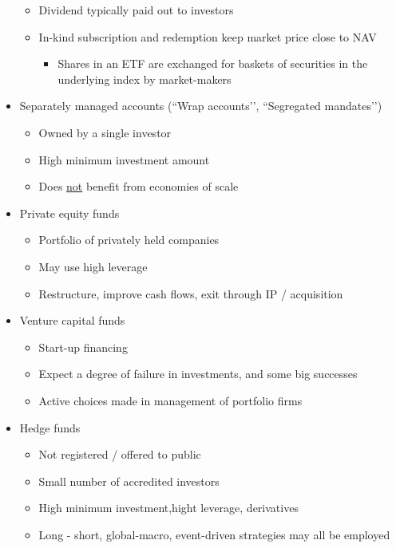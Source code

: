 \documentclass[../notes_compiled.tex]{subfiles}
\begin{document}
\begin{itemize}
\begin{itemize}
\item Dividend typically paid out to investors
\item In-kind subscription and redemption keep market price close to NAV
\begin{itemize}
\item Shares in an ETF are exchanged for baskets of securities in the underlying index by market-makers
\end{itemize}
\end{itemize}
\item Separately managed accounts (``Wrap accounts’’, ``Segregated mandates’’)
\begin{itemize}
\item Owned by a single investor
\item High minimum investment amount
\item Does \underline{not} benefit from economies of scale
\end{itemize}
\item Private equity funds
\begin{itemize}
\item Portfolio of privately held companies
\item May use high leverage
\item Restructure, improve cash flows, exit through IP / acquisition
\end{itemize}
\item Venture capital funds
\begin{itemize}
\item Start-up financing
\item Expect a degree of failure in investments, and some big successes
\item Active choices made in management of portfolio firms
\end{itemize}
\item Hedge funds
\begin{itemize}
\item Not registered / offered to public
\item Small number of accredited investors
\item High minimum investment,hight leverage, derivatives
\item Long - short, global-macro, event-driven strategies may all be employed
\end{itemize}
\end{itemize}
\end{document}
